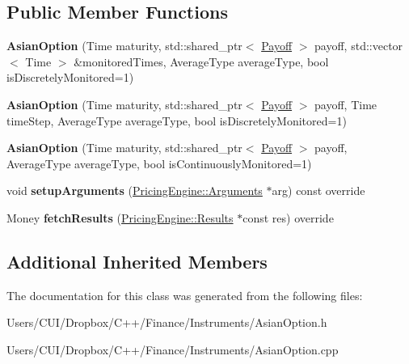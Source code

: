 \subsection*{Public Member Functions}
\begin{DoxyCompactItemize}
\item 
\hypertarget{class_asian_option_aa4020dfa8edd8d1e8f2756b633b3828b}{}\label{class_asian_option_aa4020dfa8edd8d1e8f2756b633b3828b} 
{\bfseries Asian\+Option} (Time maturity, std\+::shared\+\_\+ptr$<$ \hyperlink{class_payoff}{Payoff} $>$ payoff, std\+::vector$<$ Time $>$ \&monitored\+Times, Average\+Type average\+Type, bool is\+Discretely\+Monitored=1)
\item 
\hypertarget{class_asian_option_a055f90a9d85eac93bac28cc9901489af}{}\label{class_asian_option_a055f90a9d85eac93bac28cc9901489af} 
{\bfseries Asian\+Option} (Time maturity, std\+::shared\+\_\+ptr$<$ \hyperlink{class_payoff}{Payoff} $>$ payoff, Time time\+Step, Average\+Type average\+Type, bool is\+Discretely\+Monitored=1)
\item 
\hypertarget{class_asian_option_af6dc588a9183209493caf9eb7eb5e572}{}\label{class_asian_option_af6dc588a9183209493caf9eb7eb5e572} 
{\bfseries Asian\+Option} (Time maturity, std\+::shared\+\_\+ptr$<$ \hyperlink{class_payoff}{Payoff} $>$ payoff, Average\+Type average\+Type, bool is\+Continuously\+Monitored=1)
\item 
\hypertarget{class_asian_option_a475cbd83529df369b371ee44f63cdd08}{}\label{class_asian_option_a475cbd83529df369b371ee44f63cdd08} 
void {\bfseries setup\+Arguments} (\hyperlink{class_pricing_engine_1_1_arguments}{Pricing\+Engine\+::\+Arguments} $\ast$arg) const override
\item 
\hypertarget{class_asian_option_a99cd9956b73d99a64748c913dcccd6ea}{}\label{class_asian_option_a99cd9956b73d99a64748c913dcccd6ea} 
Money {\bfseries fetch\+Results} (\hyperlink{class_pricing_engine_1_1_results}{Pricing\+Engine\+::\+Results} $\ast$const res) override
\end{DoxyCompactItemize}
\subsection*{Additional Inherited Members}


The documentation for this class was generated from the following files\+:\begin{DoxyCompactItemize}
\item 
Users/\+C\+U\+I/\+Dropbox/\+C++/\+Finance/\+Instruments/Asian\+Option.\+h\item 
Users/\+C\+U\+I/\+Dropbox/\+C++/\+Finance/\+Instruments/Asian\+Option.\+cpp\end{DoxyCompactItemize}
